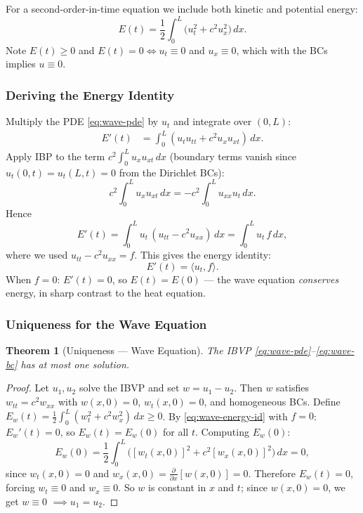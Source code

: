 \documentclass[12pt,a4paper]{article}
\theoremstyle{plain}
\newtheorem{theorem}{Theorem}[section]
\theoremstyle{definition}
\begin{document}
For a second-order-in-time equation we include both kinetic and potential energy:
\begin{equation}
  E(t) = \frac{1}{2}\int_0^L \bigl(u_t^2 + c^2 u_x^2\bigr)\,dx.
  \label{eq:wave-energy}
\end{equation}
Note $E(t)\geq 0$ and $E(t)=0 \iff u_t\equiv 0$ and $u_x\equiv 0$, which with
the BCs implies $u\equiv 0$.

\subsubsection*{Deriving the Energy Identity}

Multiply the PDE \eqref{eq:wave-pde} by $u_t$ and integrate over $(0,L)$:
\begin{align*}
  E'(t)
  &= \int_0^L (u_t u_{tt} + c^2 u_x u_{xt})\,dx.
\end{align*}
Apply IBP to the term $c^2\int_0^L u_x u_{xt}\,dx$ (boundary terms vanish since
$u_t(0,t)=u_t(L,t)=0$ from the Dirichlet BCs):
\[
  c^2\int_0^L u_x u_{xt}\,dx = -c^2\int_0^L u_{xx} u_t\,dx.
\]
Hence
\[
  E'(t) = \int_0^L u_t\,(u_{tt}-c^2 u_{xx})\,dx = \int_0^L u_t\,f\,dx,
\]
where we used $u_{tt}-c^2 u_{xx}=f$. This gives the energy identity:
\begin{equation}
  \boxed{E'(t) = \langle u_t, f\rangle.}
  \label{eq:wave-energy-id}
\end{equation}
When $f=0$: $E'(t)=0$, so $E(t)=E(0)$ — the wave equation \emph{conserves}
energy, in sharp contrast to the heat equation.

\subsubsection*{Uniqueness for the Wave Equation}

\begin{theorem}[Uniqueness — Wave Equation]
  \label{thm:wave-unique}
  The IBVP \eqref{eq:wave-pde}--\eqref{eq:wave-bc} has at most one solution.
\end{theorem}

\begin{proof}
Let $u_1,u_2$ solve the IBVP and set $w=u_1-u_2$. Then $w$ satisfies
$w_{tt}=c^2 w_{xx}$ with $w(x,0)=0$, $w_t(x,0)=0$, and homogeneous BCs.
Define $E_w(t)=\tfrac{1}{2}\int_0^L(w_t^2+c^2 w_x^2)\,dx\geq 0$.
By \eqref{eq:wave-energy-id} with $f=0$: $E_w'(t)=0$, so $E_w(t)=E_w(0)$ for all $t$.
Computing $E_w(0)$:
\[
  E_w(0) = \frac{1}{2}\int_0^L\bigl([w_t(x,0)]^2 + c^2[w_x(x,0)]^2\bigr)\,dx = 0,
\]
since $w_t(x,0)=0$ and $w_x(x,0)=\tfrac{\partial}{\partial x}[w(x,0)]=0$.
Therefore $E_w(t)=0$, forcing $w_t\equiv 0$ and $w_x\equiv 0$.
So $w$ is constant in $x$ and $t$; since $w(x,0)=0$, we get $w\equiv 0$ $\implies u_1 = u_2$.
\end{proof}
\end{document}
